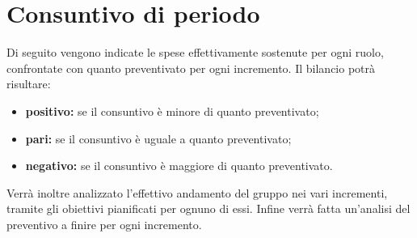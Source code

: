 \section{Consuntivo di periodo}

Di seguito vengono indicate le spese effettivamente sostenute per ogni ruolo, confrontate con quanto preventivato per ogni incremento. Il bilancio potrà risultare:

\begin{itemize}
\item \textbf{positivo:} se il consuntivo è minore di quanto preventivato;
\item \textbf{pari:} se il consuntivo è uguale a quanto preventivato;
\item \textbf{negativo:} se il consuntivo è maggiore di quanto preventivato.
\end{itemize}

Verrà inoltre analizzato l'effettivo andamento del gruppo nei vari incrementi, tramite gli obiettivi pianificati per ognuno di essi. Infine verrà fatta un'analisi del preventivo a finire per ogni incremento.





\newpage



